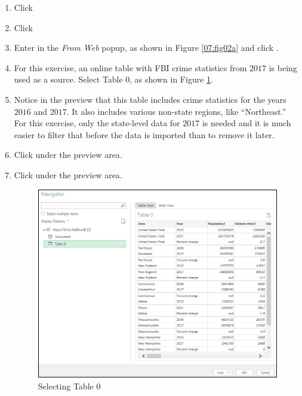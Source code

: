 \begin{enumbox}
	\begin{enumerate}
		\item {} Click 
		\item {} Click 
		\item Enter  in the \textit{From Web} popup, as shown in Figure \ref{07:fig02a} and click .
		\item For this exercise, an online table with FBI crime statistics from $ 2017 $ is being used as a source. Select Table $ 0 $, as shown in Figure \ref{07:fig02d}.
		\item Notice in the preview that this table includes crime statistics for the years $ 2016 $ and $ 2017 $. It also includes various non-state regions, like ``Northeast.'' For this exercise, only the state-level data for $ 2017 $ is needed and it is much easier to filter that before the data is imported than to remove it later.
		\item {} Click  under the preview area.
		\item {} Click  under the preview area.

		\begin{figure}[H]
			\centering
			\includegraphics[width=\maxwidth{.95\linewidth}]{gfx/ch07_fig02d}
			\caption{Selecting Table 0}
			\label{07:fig02d}
		\end{figure}


\end{enumerate}
\end{enumbox}
